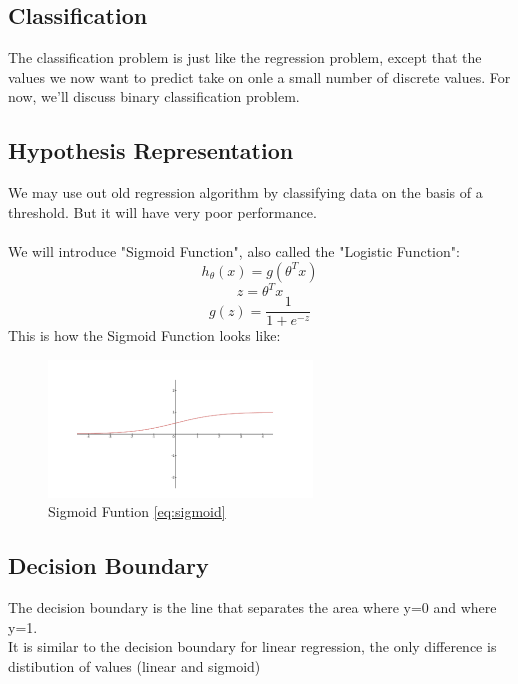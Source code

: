 \documentclass[12pt, A4]{report}
\begin{document}
  \subsection*{Classification}
    The classification problem is just like the regression problem, except that the values we now want to predict take on onle a small number of discrete values. For now, we'll discuss binary classification problem.

  \subsection*{Hypothesis Representation}
    We may use out old regression algorithm by classifying data on the basis of a threshold. But it will have very poor performance.\\ 
    \\We will introduce "Sigmoid Function", also called the "Logistic Function":
    \begin{equation}
      h_\theta(x) = g(\theta^{T}x)
    \end{equation}
    \begin{equation}
      z = \theta^{T}x
    \end{equation}
    \begin{equation}\label{eq:sigmoid}
      g(z) = \frac{1}{1+e^{-z}}
    \end{equation}
    This is how the Sigmoid Function looks like:
    \begin{figure}[h]
      \centering
      \includegraphics[scale = 1]{sigmoid.png}
      \caption{Sigmoid Funtion \ref{eq:sigmoid}}
    \end{figure}

  \subsection*{Decision Boundary}
    The decision boundary is the line that separates the area where y=0 and where y=1.\\
    It is similar to the decision boundary for linear regression, the only difference is distibution of values (linear and sigmoid)
\end{document}
